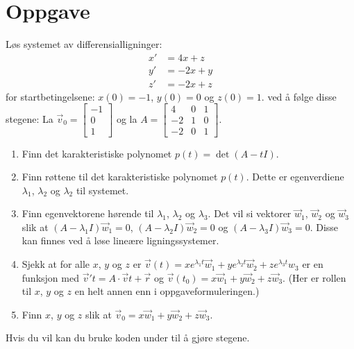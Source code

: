 \documentclass{amsart}
\theoremstyle{definition}
\theoremstyle{remark}
\numberwithin{equation}{section}
\begin{document}
\section{Oppgave}
Løs systemet av differensialligninger:
\begin{align*}
  x' &= 4x + z \\
  y' &= -2x + y \\
  z' &= -2x + z
\end{align*}
for startbetingelsene:
$x(0) = -1$, $y(0) = 0$ og $z(0) = 1$.
ved å følge disse stegene:
La $\vec v_0 = 
\begin{bmatrix}-1\\0\\1\end{bmatrix}$ og la
$A = \begin{bmatrix}4&0&1\\-2&1&0\\-2&0&1\end{bmatrix}.$
\begin{enumerate}
  \item Finn det karakteristiske polynomet $p(t) = \det(A - tI)$.
  \item Finn røttene til det karakteristiske polynomet $p(t)$. Dette er
    egenverdiene $\lambda_1$, $\lambda_2$ og $\lambda_2$ til systemet.
  \item Finn egenvektorene hørende til $\lambda_1$, $\lambda_2$ og $\lambda_3$.
    Det vil si vektorer $\vec w_1$, $\vec w_2$ og $\vec w_3$ slik at $(A
    -\lambda_1 I) \vec w_1 = 0$, $(A -\lambda_2 I) \vec w_2 = 0$ og $(A
    -\lambda_3 I) \vec w_3 = 0$. Disse kan finnes ved å løse lineære
    ligningssystemer.
  \item Sjekk at for alle $x$, $y$ og $z$ er $\vec v(t) = 
    xe^{\lambda_1 t} \vec w_1 + ye^{\lambda_2 t} \vec w_2 + ze^{\lambda_3 t}w_3$ er en
    funksjon med $\vec v't = A \cdot \vec vt + \vec r$ og $\vec v(t_0) = x\vec
    w_1 + y \vec w_2 + z\vec w_3$. (Her er rollen til $x$, $y$ og $z$ en helt
    annen enn i oppgaveformuleringen.)
  \item Finn $x$, $y$ og $z$ slik at $\vec v_0 = x\vec w_1 + y \vec w_2 + z\vec w_3$.
\end{enumerate}
Hvis du vil kan du bruke koden under til å gjøre stegene.
\end{document}
